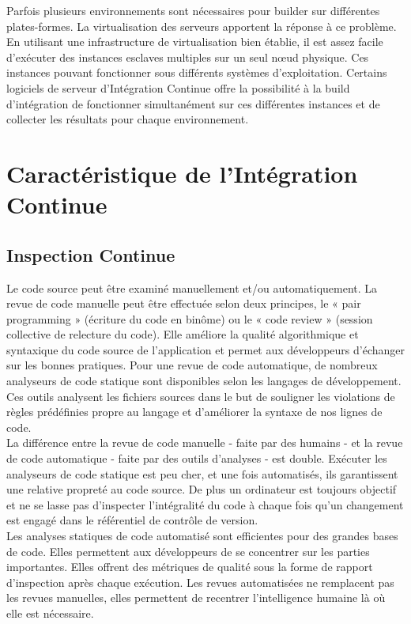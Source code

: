     Parfois plusieurs environnements sont nécessaires pour builder sur différentes plates-formes. La virtualisation des serveurs apportent la réponse à ce problème. En utilisant une infrastructure de virtualisation bien établie, il est assez facile d’exécuter des instances esclaves multiples sur un seul nœud physique. Ces instances pouvant fonctionner sous différents systèmes d’exploitation. Certains logiciels de serveur d’Intégration Continue offre la possibilité à la build d’intégration de fonctionner simultanément sur ces différentes instances et de collecter les résultats pour chaque environnement.\\

  \section{Caractéristique de l’Intégration Continue}\label{Features of Continuous Integration}
    \subsection{Inspection Continue}
    Le code source peut être examiné manuellement et/ou automatiquement. La revue de code manuelle peut être effectuée selon deux principes, le « pair programming » (écriture du code en binôme) ou le « code review » (session collective de relecture du code). Elle améliore la qualité algorithmique et syntaxique du code source de l’application et permet aux développeurs d’échanger sur les bonnes pratiques. Pour une revue de code automatique, de nombreux analyseurs de code statique sont disponibles selon les langages de développement. Ces outils analysent les fichiers sources dans le but de souligner les violations de règles prédéfinies propre au langage et d’améliorer la syntaxe de nos lignes de code.\\

    La différence entre la revue de code manuelle - faite par des humains - et la revue de code automatique - faite par des outils d’analyses - est double. Exécuter les analyseurs de code statique est peu cher, et une fois automatisés, ils garantissent une relative propreté au code source. De plus un ordinateur est toujours objectif et ne se lasse pas d’inspecter l’intégralité du code à chaque fois qu’un changement est engagé dans le référentiel de contrôle de version.\\

    Les analyses statiques de code automatisé sont efficientes pour des grandes bases de code. Elles permettent aux développeurs de se concentrer sur les parties importantes. Elles offrent des métriques de qualité sous la forme de rapport d’inspection après chaque exécution. Les revues automatisées ne remplacent pas les revues manuelles, elles permettent de recentrer l’intelligence humaine là où elle est nécessaire.\\

